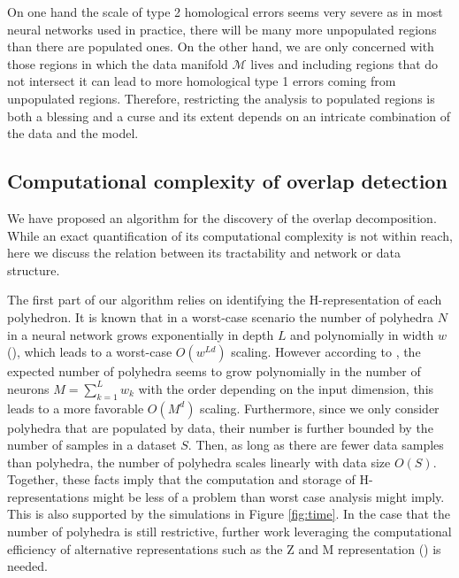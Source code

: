 \documentclass[10pt]{article} %
\theoremstyle{plain}
\theoremstyle{definition}
\theoremstyle{remark}
\begin{document}
 On one hand the scale of type 2 homological errors seems very severe as in most neural networks used in practice, there will be many more unpopulated regions than there are populated ones. On the other hand, we are only concerned with those regions in which the data manifold $\mathcal{M}$ lives and including regions that do not intersect it can lead to more homological type 1 errors coming from unpopulated regions. Therefore, restricting the analysis to populated regions is both a blessing and a curse and its extent depends on an intricate combination of the data and the model.
 
\subsection{Computational complexity of overlap detection}
We have proposed an algorithm for the discovery of the overlap decomposition. While an exact quantification of its computational complexity is not within reach, here we discuss the relation between its tractability and network or data structure. 

The first part of our algorithm relies on identifying the H-representation of each polyhedron. It is known that in a worst-case scenario the number of polyhedra $N$ in a neural network grows exponentially in depth $L$ and polynomially in width $w$ (\cite{goujon2024number}), which leads to a worst-case $O(w^{Ld})$ scaling. However according to \citep{hanin2019deep}, the expected number of polyhedra seems to grow polynomially in the number of neurons $M = \sum_{k=1}^{L}w_k$ with the order depending on the input dimension, this leads to a more favorable $O(M^d)$ scaling. Furthermore, since we only consider polyhedra that are populated by data, their number is further bounded by the number of samples in a dataset $S$. Then, as long as there are fewer data samples than polyhedra, the number of polyhedra scales linearly with data size $O(S)$. Together, these facts imply that the computation and storage of H-representations might be less of a problem than worst case analysis might imply. This is also supported by the simulations in Figure \ref{fig:time}. In the case that the number of polyhedra is still restrictive, further work leveraging the computational efficiency of alternative representations such as the Z and M representation (\cite{kochdumper2019representation, sigl2023m}) is needed.
\end{document}

